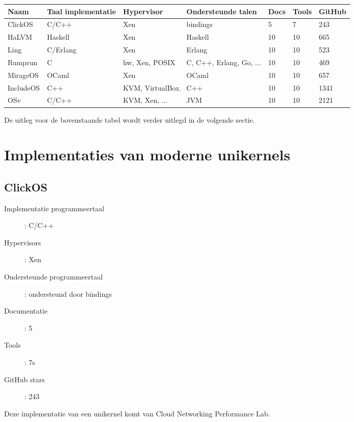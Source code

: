 \documentclass[pdftex,a4paper,12pt,twoside]{report}
\begin{document}
{\footnotesize
\begin{center}
    \begin{tabular}{| l | l | l | l | l | l | l |}
    \hline
    Naam & Taal implementatie & Hypervisor & Ondersteunde talen & Docs & Tools & GitHub \\ \hline
    ClickOS & C/C++ & Xen & bindings & 5 & 7 & 243 \\ \hline
    HaLVM & Haskell & Xen & Haskell & 10 & 10 & 665 \\ \hline
    Ling & C/Erlang & Xen & Erlang & 10 & 10 & 523 \\ \hline
    Rumprun & C & hw, Xen, POSIX & C, C++, Erlang, Go, ... & 10 & 10 & 469 \\ \hline
    MirageOS & OCaml & Xen & OCaml & 10 & 10 & 657 \\ \hline
    IncludeOS & C++ & KVM, VirtualBox & C++ & 10 & 10 & 1341 \\ \hline
    OSv & C/C++ & KVM, Xen, ... & JVM & 10 & 10 & 2121 \\ \hline
    \end{tabular}
\end{center} 
}

De uitleg voor de bovenstaande tabel wordt verder uitlegd in de volgende sectie.

\newpage

\section{Implementaties van moderne unikernels}

\subsection{ClickOS}
\begin{description}
  \item [Implementatie programmeertaal]: C/C++
  \item [Hypervisors]: Xen
  \item [Ondersteunde programmeertaal]: ondersteund door bindings
  \item [Documentatie]: 5
  \item [Tools]: 7s
  \item [GitHub stars]: 243
\end{description}

Deze implementatie van een unikernel komt van Cloud Networking Performance Lab.
\end{document}
